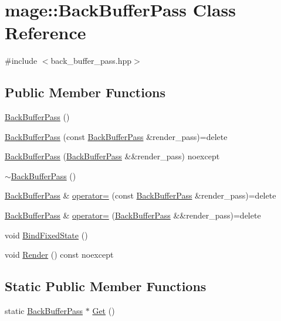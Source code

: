 \hypertarget{classmage_1_1_back_buffer_pass}{}\section{mage\+:\+:Back\+Buffer\+Pass Class Reference}
\label{classmage_1_1_back_buffer_pass}


{\ttfamily \#include $<$back\+\_\+buffer\+\_\+pass.\+hpp$>$}

\subsection*{Public Member Functions}
\begin{DoxyCompactItemize}
\item 
\hyperlink{classmage_1_1_back_buffer_pass_a46ce63d05208fc3dea43244713a6a280}{Back\+Buffer\+Pass} ()
\item 
\hyperlink{classmage_1_1_back_buffer_pass_af69d8bb752a4e35d57ebd5afedaa097d}{Back\+Buffer\+Pass} (const \hyperlink{classmage_1_1_back_buffer_pass}{Back\+Buffer\+Pass} \&render\+\_\+pass)=delete
\item 
\hyperlink{classmage_1_1_back_buffer_pass_aaccba5ea4ae969dff8ee4f9c8f5ae1e2}{Back\+Buffer\+Pass} (\hyperlink{classmage_1_1_back_buffer_pass}{Back\+Buffer\+Pass} \&\&render\+\_\+pass) noexcept
\item 
\hyperlink{classmage_1_1_back_buffer_pass_a10ccd92ff4480261e9ecfc435f5d9ed3}{$\sim$\+Back\+Buffer\+Pass} ()
\item 
\hyperlink{classmage_1_1_back_buffer_pass}{Back\+Buffer\+Pass} \& \hyperlink{classmage_1_1_back_buffer_pass_a6d1fb713b11b30a08f6d811b5e1fe29b}{operator=} (const \hyperlink{classmage_1_1_back_buffer_pass}{Back\+Buffer\+Pass} \&render\+\_\+pass)=delete
\item 
\hyperlink{classmage_1_1_back_buffer_pass}{Back\+Buffer\+Pass} \& \hyperlink{classmage_1_1_back_buffer_pass_a63adba9a29335c03c30842de8836302a}{operator=} (\hyperlink{classmage_1_1_back_buffer_pass}{Back\+Buffer\+Pass} \&\&render\+\_\+pass)=delete
\item 
void \hyperlink{classmage_1_1_back_buffer_pass_a86dd8df1ac3fac070d1373dad045c975}{Bind\+Fixed\+State} ()
\item 
void \hyperlink{classmage_1_1_back_buffer_pass_a6f0265c182a4b1ac2badd5df3fb11545}{Render} () const noexcept
\end{DoxyCompactItemize}
\subsection*{Static Public Member Functions}
\begin{DoxyCompactItemize}
\item 
static \hyperlink{classmage_1_1_back_buffer_pass}{Back\+Buffer\+Pass} $\ast$ \hyperlink{classmage_1_1_back_buffer_pass_ae925b441c80f2aa711fbba6d782e5f81}{Get} ()
\end{DoxyCompactItemize}
